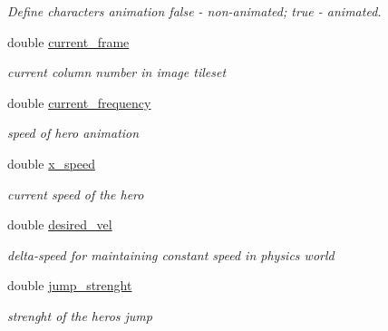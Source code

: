 \begin{DoxyCompactItemize}
\begin{DoxyCompactList}\small\item\em Define characters animation \textquotesingle{}false\textquotesingle{} -\/ non-\/animated; \textquotesingle{}true\textquotesingle{} -\/ animated. \end{DoxyCompactList}\item 
\mbox{\label{class_player_a943966c052b8bfc40439248a2d4e3f8f}} 
double \hyperlink{class_player_a943966c052b8bfc40439248a2d4e3f8f}{current\+\_\+frame}
\begin{DoxyCompactList}\small\item\em current column number in image tileset \end{DoxyCompactList}\item 
\mbox{\label{class_player_ad469c1133f407b68e90d587013b20c71}} 
double \hyperlink{class_player_ad469c1133f407b68e90d587013b20c71}{current\+\_\+frequency}
\begin{DoxyCompactList}\small\item\em speed of hero animation \end{DoxyCompactList}\item 
\mbox{\label{class_player_a8a96a60e7820f887bc0ff8e15aaf5639}} 
double \hyperlink{class_player_a8a96a60e7820f887bc0ff8e15aaf5639}{x\+\_\+speed}
\begin{DoxyCompactList}\small\item\em current speed of the hero \end{DoxyCompactList}\item 
\mbox{\label{class_player_a7798d4f62911339f255225b9f59ae497}} 
double \hyperlink{class_player_a7798d4f62911339f255225b9f59ae497}{desired\+\_\+vel}
\begin{DoxyCompactList}\small\item\em delta-\/speed for maintaining constant speed in physics world \end{DoxyCompactList}\item 
\mbox{\label{class_player_aadeca24363f2fb5d9206a2cf9c552c20}} 
double \hyperlink{class_player_aadeca24363f2fb5d9206a2cf9c552c20}{jump\+\_\+strenght}
\begin{DoxyCompactList}\small\item\em strenght of the heros jump \end{DoxyCompactList}\item 

\end{DoxyCompactItemize}
